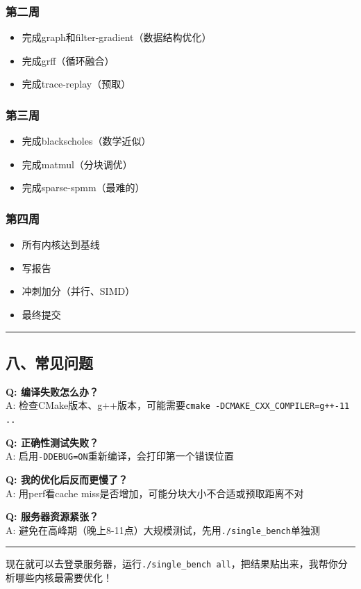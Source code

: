 \documentclass[11pt, a4paper]{article}
\begin{document}
\begin{aibox}
\subsubsection*{第二周}
\begin{itemize}
    \item[$\square$] 完成graph和filter-gradient（数据结构优化）
    \item[$\square$] 完成grff（循环融合）
    \item[$\square$] 完成trace-replay（预取）
\end{itemize}

\subsubsection*{第三周}
\begin{itemize}
    \item[$\square$] 完成blackscholes（数学近似）
    \item[$\square$] 完成matmul（分块调优）
    \item[$\square$] 完成sparse-spmm（最难的）
\end{itemize}

\subsubsection*{第四周}
\begin{itemize}
    \item[$\square$] 所有内核达到基线
    \item[$\square$] 写报告
    \item[$\square$] 冲刺加分（并行、SIMD）
    \item[$\square$] 最终提交
\end{itemize}

\begin{center}\rule{\textwidth}{0.4pt}\end{center}

\subsection*{八、常见问题}

\textbf{Q: 编译失败怎么办？}\\
A: 检查CMake版本、g++版本，可能需要\texttt{cmake -DCMAKE\_CXX\_COMPILER=g++-11 ..}

\textbf{Q: 正确性测试失败？}\\
A: 启用\texttt{-DDEBUG=ON}重新编译，会打印第一个错误位置

\textbf{Q: 我的优化后反而更慢了？}\\
A: 用perf看cache miss是否增加，可能分块大小不合适或预取距离不对

\textbf{Q: 服务器资源紧张？}\\
A: 避免在高峰期（晚上8-11点）大规模测试，先用\texttt{./single\_bench}单独测

\begin{center}\rule{\textwidth}{0.4pt}\end{center}

现在就可以去登录服务器，运行\texttt{./single\_bench all}，把结果贴出来，我帮你分析哪些内核最需要优化！
\end{aibox}
\end{document}
